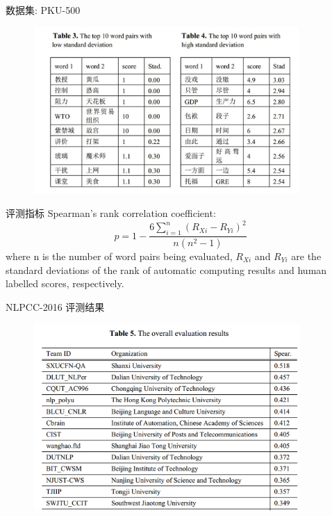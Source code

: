 \documentclass[aspectratio=169]{beamer} %
\begin{document}
    \begin{frame}{数据集: PKU-500}
    \begin{center}
      \begin{figure}
      \includegraphics[width=4in,height=2.5in]{pku-500-2.jpg}
      \end{figure}
      \end{center}
    \end{frame}

    \begin{frame}{评测指标}
     Spearman's rank correlation coefficient: 
     \begin{equation}
        p = 1 - \frac{6\sum_{i=1}^n{(R_{Xi} - R_{Yi})^2}}{n(n^2 - 1)}
     \end{equation}
     where n is the number of word pairs being evaluated, $R_{Xi}$ and $R_{Yi}$ 
     are the standard deviations of the rank of automatic computing results and 
     human labelled scores, respectively.
    \end{frame}

    \begin{frame}{NLPCC-2016 评测结果}
    \begin{center}
      \begin{figure}
      \includegraphics[width=4in,height=2.8in]{ws-result.png}
      \end{figure}
      \end{center}
    \end{frame}
\end{document}
